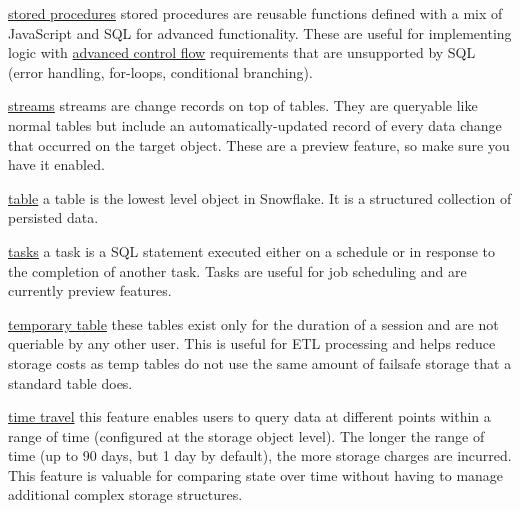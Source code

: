 \documentclass[9pt]{innovativeinnovation-cheatsheet}
\begin{document}
\begin{multicols}{3}
      \item \href{https://docs.snowflake.net/manuals/sql-reference/stored-procedures-overview.html}{stored procedures}  stored procedures are reusable functions defined with a mix of JavaScript and SQL for advanced functionality. These are useful for implementing logic with \href{https://developer.mozilla.org/en-US/docs/Glossary/Control_flow}{advanced control flow} requirements that are unsupported by SQL (error handling, for-loops, conditional branching).
      
      \item \href{https://docs.snowflake.net/manuals/user-guide/streams.html}{streams}  streams are change records on top of tables. They are queryable like normal tables but include an automatically-updated record of every data change that occurred on the target object. These are a preview feature, so make sure you have it enabled.
      
      \item \href{https://docs.snowflake.net/manuals/sql-reference/ddl-table.html}{table}  a table is the lowest level object in Snowflake. It is a structured collection of persisted data.
      
      \item \href{https://docs.snowflake.net/manuals/user-guide/tasks.html}{tasks}  a task is a SQL statement executed either on a schedule or in response to the completion of another task. Tasks are useful for job scheduling and are currently preview features.
      
      \item \href{https://docs.snowflake.net/manuals/user-guide/tables-temp-transient.html#temporary-tables}{temporary table}  these tables exist only for the duration of a session and are not queriable by any other user. This is useful for ETL processing and helps reduce storage costs as temp tables do not use the same amount of failsafe storage that a standard table does.
      
      \item \href{https://docs.snowflake.net/manuals/user-guide/data-time-travel.html}{time travel}  this feature enables users to query data at different points within a range of time (configured at the storage object level). The longer the range of time (up to 90 days, but 1 day by default), the more storage charges are incurred. This feature is valuable for comparing state over time without having to manage additional complex storage structures.
      

\end{multicols}
\end{document}
